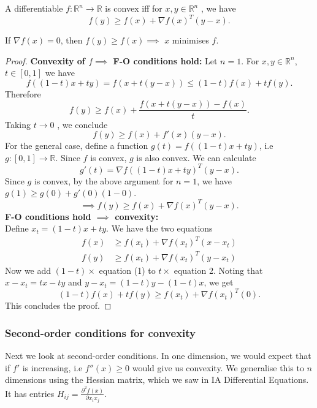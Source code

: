 \documentclass[a4paper]{scrartcl}
\begin{document}
\begin{theorem}
	 A differentiable $f:\mathbb{R}^n\rightarrow \mathbb{R}$ is convex iff for $x,y \in \mathbb{R}^{n} $ , we have 
	 \[f(y) \geq f(x)+\nabla f(x)^T (y-x).\]  
\end{theorem}

\begin{remark}
	If $\nabla f(x)=0$, then $f(y)\geq f(x) \implies$ $x$ minimises $f$.
\end{remark}

\begin{proof}
	\textbf{Convexity of $f \implies$ F-O conditions hold:}\newline 
	 Let $n=1$. For $x,y\in \mathbb{R}^{n}$, $t \in [0,1]$ we have 
	 \[f((1-t)x+ty)=f(x+t(y-x))\leq (1-t)f(x)+tf(y).\]
	 Therefore 
	 \[f(y) \geq f(x)+\frac{f(x+t(y-x))-f(x)}{t}.\] 
	 Taking $t \rightarrow 0$ , we conclude 
	 \[f(y) \geq f(x)+f'(x)(y-x).\]
	 For the general case, define a function $g(t)=f((1-t)x+ty)$, i.e $g: [0,1] \rightarrow \mathbb{R}$. Since $f$ is convex, $g$ is also convex. We can calculate 
	 \[g'(t)=\nabla f((1-t)x+ty)^T(y-x).\] 
	 Since $g$ is convex, by the above argument for $n=1$, we have $g(1)\geq g(0)+g'(0)(1-0)$. 
	 \[\implies f(y) \geq f(x)+\nabla f(x)^T(y-x).\] 
	 \textbf{F-O conditions hold $\implies$ convexity:}\\
	 Define $x_t=(1-t)x+ty$. We have the two equations
	 \begin{align}
		 f(x) &\geq f(x_t)+\nabla f(x_t)^T (x-x_t)\\
		 f(y) &\geq f(x_t)+\nabla f(x_t)^T (y-x_t)
	 \end{align}
	 Now we add $(1-t)\times$ equation (1) to $t \times$ equation 2. Noting that $x-x_t=tx-ty$ and $y-x_t=(1-t)y-(1-t)x$, we get 
	 \[(1-t)f(x)+tf(y)\geq f(x_t)+\nabla f(x_t)^T (0).\] 
	 This concludes the proof.
\end{proof}

\subsubsection{Second-order conditions for convexity}

Next we look at second-order conditions. In one dimension, we would expect that if $f'$ is increasing, i.e $f''(x) \geq 0$ would give us convexity. We generalise this to $n$ dimensions using the Hessian matrix, which we saw in IA Differential Equations. It has entries $H_{ij}=\frac{\partial^2 f(x)}{\partial x_i x_j} $.
\end{document}
